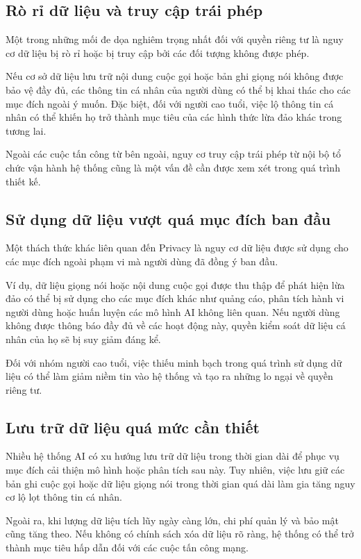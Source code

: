 \subsection{Rò rỉ dữ liệu và truy cập trái phép}
Một trong những mối đe dọa nghiêm trọng nhất đối với quyền riêng tư là nguy cơ dữ liệu bị rò rỉ hoặc bị truy cập bởi các đối tượng không được phép.

Nếu cơ sở dữ liệu lưu trữ nội dung cuộc gọi hoặc bản ghi giọng nói không được bảo vệ đầy đủ, các thông tin cá nhân của người dùng có thể bị khai thác cho các mục đích ngoài ý muốn. Đặc biệt, đối với người cao tuổi, việc lộ thông tin cá nhân có thể khiến họ trở thành mục tiêu của các hình thức lừa đảo khác trong tương lai.

Ngoài các cuộc tấn công từ bên ngoài, nguy cơ truy cập trái phép từ nội bộ tổ chức vận hành hệ thống cũng là một vấn đề cần được xem xét trong quá trình thiết kế.

\subsection{Sử dụng dữ liệu vượt quá mục đích ban đầu}
Một thách thức khác liên quan đến Privacy là nguy cơ dữ liệu được sử dụng cho các mục đích ngoài phạm vi mà người dùng đã đồng ý ban đầu.

Ví dụ, dữ liệu giọng nói hoặc nội dung cuộc gọi được thu thập để phát hiện lừa đảo có thể bị sử dụng cho các mục đích khác như quảng cáo, phân tích hành vi người dùng hoặc huấn luyện các mô hình AI không liên quan. Nếu người dùng không được thông báo đầy đủ về các hoạt động này, quyền kiểm soát dữ liệu cá nhân của họ sẽ bị suy giảm đáng kể.

Đối với nhóm người cao tuổi, việc thiếu minh bạch trong quá trình sử dụng dữ liệu có thể làm giảm niềm tin vào hệ thống và tạo ra những lo ngại về quyền riêng tư.

\subsection{Lưu trữ dữ liệu quá mức cần thiết}
Nhiều hệ thống AI có xu hướng lưu trữ dữ liệu trong thời gian dài để phục vụ mục đích cải thiện mô hình hoặc phân tích sau này. Tuy nhiên, việc lưu giữ các bản ghi cuộc gọi hoặc dữ liệu giọng nói trong thời gian quá dài làm gia tăng nguy cơ lộ lọt thông tin cá nhân.

Ngoài ra, khi lượng dữ liệu tích lũy ngày càng lớn, chi phí quản lý và bảo mật cũng tăng theo. Nếu không có chính sách xóa dữ liệu rõ ràng, hệ thống có thể trở thành mục tiêu hấp dẫn đối với các cuộc tấn công mạng.

